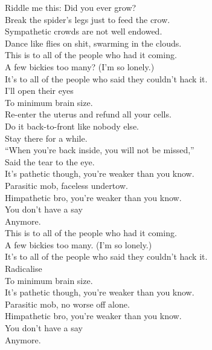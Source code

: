 
Riddle me this: Did you ever grow? \\
Break the spider's legs just to feed the crow. \\
Sympathetic crowds are not well endowed. \\
Dance like flies on shit, swarming in the clouds. \\

This is to all of the people who had it coming. \\
A few bickies too many? (I'm so lonely.) \\
It's to all of the people who said they couldn't hack it. \\
I'll open their eyes \\
To minimum brain size. \\

Re-enter the uterus and refund all your cells. \\
Do it back-to-front like nobody else. \\
Stay there for a while. \\
``When you're back inside, you will not be missed,'' \\
Said the tear to the eye. \\

It's pathetic though, you're weaker than you know. \\
Parasitic mob, faceless undertow. \\
Himpathetic bro, you're weaker than you know. \\
You don't have a say \\
Anymore. \\

This is to all of the people who had it coming. \\
A few bickies too many. (I'm so lonely.) \\
It's to all of the people who said they couldn't hack it. \\
Radicalise \\
To minimum brain size. \\

It's pathetic though, you're weaker than you know. \\
Parasitic mob, no worse off alone. \\
Himpathetic bro, you're weaker than you know. \\
You don't have a say \\
Anymore. \\


